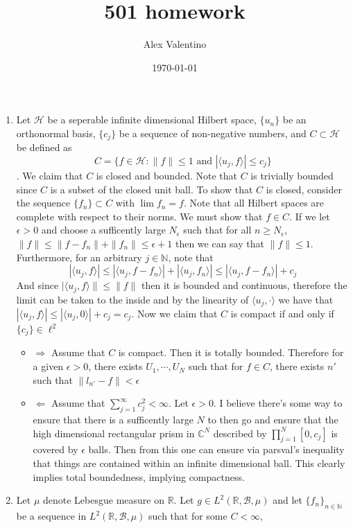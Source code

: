 \documentclass[12pt, letterpaper]{article}
\date{\today}
\author{Alex Valentino}
\title{501 homework}
\newcommand{\N}{\mathbb{N}}
\newcommand{\R}{\mathbb{R}}
\newcommand{\C}{\mathbb{C}}
\begin{document}
\begin{enumerate}
	\item Let $\mathcal{H}$ be a seperable infinite dimensional Hilbert space, $\{u_n\}$ be an 
	orthonormal basis, $\{c_j\}$ be a sequence of non-negative numbers,
	and $C \subset \mathcal{H} $ be defined as 
	$$C = \{f \in \mathcal{H}: \| f \| \leq 1 \text{ and } |\langle u_j, f \rangle|\leq c_j\}$$.
	We claim that $C$ is closed and bounded.  Note that $C$ is trivially bounded since $C$ is a subset of the 
	closed unit ball. To show that $C$ is closed, consider the sequence $\{f_n\} \subset C$ with 
	$\lim f_n = f$.  Note that all Hilbert spaces are complete with respect to their norms.  We must show that 
	$f \in C$.  If we let $\epsilon > 0$ and choose a sufficently large 
	$N_\epsilon$ such that for all $n \geq N_\epsilon$, $\|f\| \leq \|f - f_n\| + \|f_n\| \leq \epsilon + 1$ then 
	we can say that $\|f\| \leq 1$.  Furthermore, for an arbitrary $j \in \N$, note that 
	$$
	| \langle u_j, f \rangle | \leq | \langle u_j, f - f_n \rangle | + | \langle u_j, f_n \rangle | \leq  | \langle u_j, f - f_n \rangle | + c_j
	$$
	And since $|\langle u_j, f\rangle\| \leq \|f\|$ then it is bounded and continuous, therefore the limit can be taken
	to the inside and by the linearity of $\langle u_j, \cdot \rangle$ we have that 
	$| \langle u_j, f \rangle | \leq |\langle u_j, 0 \rangle| +   c_j = c_j$.  
	Now we claim that $C$ is compact if and only if $\{c_j\} \in \ell^2$
	\begin{itemize}
		\item $\Rightarrow$ Assume that $C$ is compact.  Then it is totally bounded.  Therefore for a given 
		$\epsilon > 0$, there exists $U_1,\cdots,U_N$ such that for $f \in C$, there exists $n'$ such that 
		$\|l_{n'} - f\| < \epsilon$
		\item $\Leftarrow$ Assume that $\sum_{j=1}^\infty c_j^2 < \infty$.  Let $\epsilon > 0$.   
		I believe there's some way to ensure that there is a sufficently large $N$ to then go and 
		ensure that the high dimensional rectangular prism in $\C^N$ described by 
		$\prod_{j=1}^N [0,c_j]$ is covered by $\epsilon$ balls.  Then from this one can ensure via parsval's inequality
		that things are contained within an infinite dimensional ball.  This clearly implies total boundedness, 
		implying compactness.
	\end{itemize}
	\item Let $\mu$ denote Lebesgue measure on $\R$. Let $g \in L^2(\R, \mathcal{B}, \mu)$ and let 
	$\{f_n\}_{n \in \N}$ be a sequence in $L^2(\R, \mathcal{B},\mu)$ such that for some $C < \infty$, 

\end{enumerate}
\end{document}
